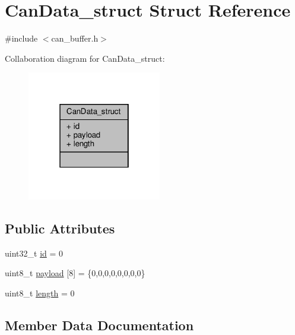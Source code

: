 \hypertarget{structCanData__struct}{}\section{Can\+Data\+\_\+struct Struct Reference}
\label{structCanData__struct}


{\ttfamily \#include $<$can\+\_\+buffer.\+h$>$}



Collaboration diagram for Can\+Data\+\_\+struct\+:
\nopagebreak
\begin{figure}[H]
\begin{center}
\leavevmode
\includegraphics[width=166pt]{structCanData__struct__coll__graph}
\end{center}
\end{figure}
\subsection*{Public Attributes}
\begin{DoxyCompactItemize}
\item 
uint32\+\_\+t \hyperlink{structCanData__struct_a1f6f5483251189fc5819762739e6e84d}{id} = 0
\item 
uint8\+\_\+t \hyperlink{structCanData__struct_a0da7d3f1624043fc775968620c0be651}{payload} \mbox{[}8\mbox{]} = \{0,0,0,0,0,0,0,0\}
\item 
uint8\+\_\+t \hyperlink{structCanData__struct_ad1ca4194a316ab04be6e24276fb20055}{length} = 0
\end{DoxyCompactItemize}


\subsection{Member Data Documentation}
\mbox{\label{structCanData__struct_a1f6f5483251189fc5819762739e6e84d}} 
